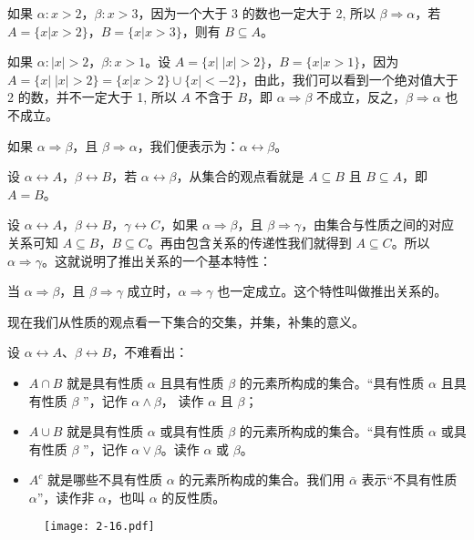 如果 $\alpha :x>2$，$\beta :x>3$，因为一个大于 3 的数也一定大于 2, 所以 $\beta \Rightarrow\alpha$，若 $A=\{ x|x>2\}$，$B=\{ x|x>3\}$，则有 $B\subseteq A$。

如果 $\alpha :|x|>2$，$\beta :x>1$。设 $A=\{x|\; |x|>2\}$，$B=\{ x| x>1\}$，因为 $A=\{ x|\; |x|>2\}=\{x|x>2\}\cup\{x|<-2\}$，由此，我们可以看到一个绝对值大于 2
的数，并不一定大于 1, 所以 $A$ 不含于 $B$，即 $\alpha \Rightarrow\beta$ 不成立，反之，$\beta \Rightarrow \alpha$ 也不成立。

如果 $\alpha \Rightarrow\beta$，且 $\beta \Rightarrow\alpha$，我们便表示为：$\alpha \longleftrightarrow \beta$。

设 $\alpha \longleftrightarrow A$，$\beta \longleftrightarrow B$，若 $\alpha \longleftrightarrow\beta$，从集合的观点看就是 $A\subseteq B$ 且 $B\subseteq A$，即 $A=B$。

设 $\alpha \longleftrightarrow A$，$\beta \longleftrightarrow B$，$\gamma\longleftrightarrow C$，如果 $\alpha \Rightarrow\beta$，且 $\beta \Rightarrow\gamma$，由集合与性质之间的对应关系可知 $A\subseteq B$，$B\subseteq C$。再由包含关系的传递性我们就得到 $A\subseteq C$。所以 $\alpha \Rightarrow\gamma$。这就说明了推出关系的一个基本特性：

当 $\alpha \Rightarrow\beta$，且 $\beta \Rightarrow\gamma$ 成立时，$\alpha \Rightarrow\gamma$ 也一定成立。这个特性叫做推出关系的。

现在我们从性质的观点看一下集合的交集，并集，补集的意义。

设 $\alpha \longleftrightarrow A$、$\beta\longleftrightarrow B$，不难看出：
\begin{itemize}
	\item $A\cap B$ 就是具有性质 $\alpha$ 且具有性质 $\beta$ 的元素所构成的集合。“具有性质 $\alpha$ 且具有性质 $\beta$ ”，记作 $\alpha \wedge\beta$， 读作 $\alpha$ 且 $\beta$；
	\item $A\cup B$ 就是具有性质 $\alpha$ 或具有性质 $\beta$ 的元素所构成的集合。“具有性质 $\alpha$ 或具有性质 $\beta$ ”，记作 $\alpha \vee\beta$。读作 $\alpha$ 或 $\beta$。 
	\item $A^c$ 就是哪些不具有性质 $\alpha$ 的元素所构成的集合。我们用 $\bar{\alpha}$ 表示“不具有性质 $\alpha$”，读作非 $\alpha$，也叫 $\alpha$ 的反性质。
\end{itemize}

\begin{figure}
	\texttt{[image: 2-16.pdf]}   
	\caption{}\label{fig:2-16}
\end{figure}

